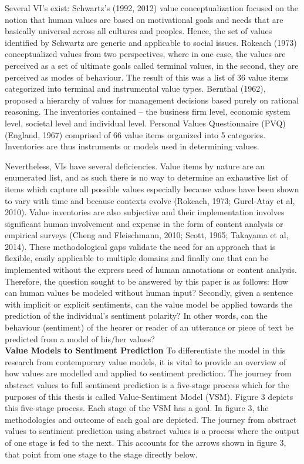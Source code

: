Several VI's exist: Schwartz's (1992, 2012) value conceptualization focused on the notion that human values are based on motivational goals and needs that are basically universal across all cultures and peoples. Hence, the set of values identified by Schwartz are generic and applicable to social issues. Rokeach (1973) conceptualized values from two perspectives, where in one case, the values are perceived as a set of ultimate goals called terminal values, in the second, they are perceived as modes of behaviour. The result of this was a list of 36 value items categorized into terminal and instrumental value types. Bernthal (1962), proposed a hierarchy of values for management decisions based purely on rational reasoning. The inventories contained – the business firm level, economic system level, societal level and individual level. Personal Values Questionnaire (PVQ) (England, 1967) comprised of 66 value items organized into 5 categories. Inventories are thus instruments or models used in determining values. 

Nevertheless, VIs have several deficiencies. Value items by nature are an enumerated list, and as such there is no way to determine an exhaustive list of items which capture all possible values especially because values have been shown to vary with time and because contexts evolve (Rokeach, 1973; Gurel-Atay et al, 2010). Value inventories are also subjective and their implementation involves significant human involvement and expense in the form of content analysis or empirical surveys (Cheng and Fleischmann, 2010; Scott, 1965; Takayama et al, 2014). These methodological gaps validate the need for an approach that is flexible, easily applicable to multiple domains and finally one that can be implemented without the express need of human annotations or content analysis. Therefore, the question sought to be answered by this paper is as follows:  How can human values be modeled without human input? Secondly, given a sentence with implicit or explicit sentiments, can the value model be applied towards the prediction of the individual's sentiment polarity? In other words, can the behaviour (sentiment) of the hearer or reader of an utterance or piece of text be predicted from a model of his/her values?\\
\noindent \textbf{Value Models to Sentiment Prediction}
\newline To differentiate the model in this research from contemporary value models, it is vital to provide an overview of how values are modelled and applied to sentiment prediction. The journey from abstract values to full sentiment prediction is a five-stage process which for the purposes of this thesis is called Value-Sentiment Model (VSM). Figure 3 depicts this five-stage process.
Each stage of the VSM has a goal. In figure 3, the methodologies and outcome of each goal are depicted. The journey from abstract values to sentiment prediction using abstract values is a process where the output of one stage is fed to the next. This accounts for the arrows shown in figure 3, that point from one stage to the stage directly below. 


